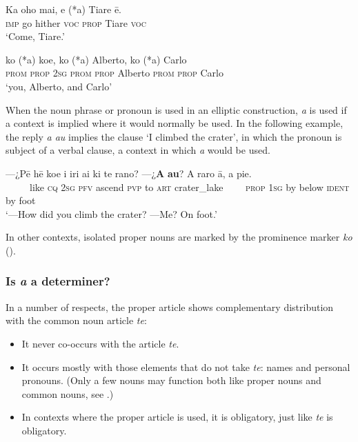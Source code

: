 \ea\label{ex:5.193}
\gll Ka oho mai, e (*a) Tiare ē. \\
\textsc{imp} go hither \textsc{voc} \textsc{prop} Tiare \textsc{voc} \\

\glt 
‘Come, Tiare.’ \textstyleExampleref{[R152.035]} 
\z

\ea\label{ex:5.194}
\gll ko (*a) koe, ko (*a) Alberto, ko (*a) Carlo \\
\textsc{prom} \textsc{prop} \textsc{2sg} \textsc{prom} \textsc{prop} Alberto \textsc{prom} \textsc{prop} Carlo \\

\glt 
‘you, Alberto, and Carlo’ \textstyleExampleref{[R103.026]} 
\z

When the noun phrase or pronoun is used in an elliptic construction, \textit{a} is used if a context is implied where it would normally be used. In the following example, the reply \textit{a au} implies the clause ‘I climbed the crater’, in which the pronoun is subject of a verbal clause, a context in which \textit{a} would be used. 

\ea\label{ex:5.195}
\gll —¿Pē hē koe i iri ai ki te rano? —¿\textbf{A} \textbf{au}? A raro {\ꞌ}ā, a pie. \\
~~~~~like \textsc{cq} \textsc{2sg} \textsc{pfv} ascend \textsc{pvp} to \textsc{art} crater\_lake ~~~~\textsc{prop} \textsc{1sg} by below \textsc{ident} by foot \\

\glt
‘—How did you climb the crater? —Me? On foot.’ \textstyleExampleref{[R623.015–017]}
\z

In other contexts, isolated proper nouns are marked by the prominence marker \textit{ko} ().

\subsubsection[Is a a determiner?]{Is \textit{a} a determiner?}\label{sec:5.13.2.2}

In a number of respects, the proper article shows complementary distribution with the common noun article \textit{te}:

\begin{itemize}
\item 
It never co-occurs with the article \textit{te}.

\item 
It occurs mostly with those elements that do not take \textit{te}: names and personal pronouns. (Only a few nouns may function both like proper nouns and common nouns, see .)

\item 
In contexts where the proper article is used, it is obligatory, just like \textit{te} is obligatory.

\end{itemize}

